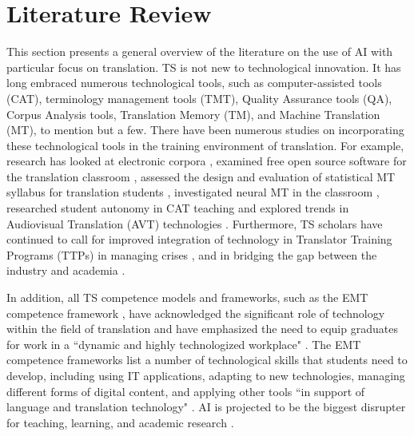 \documentclass[english]{textolivre}
\begin{document}
\section{Literature Review}
This section presents a general overview of the literature on the use of AI with particular focus on translation. TS is not new to technological innovation. It has long embraced numerous technological tools, such as computer-assisted tools (CAT), terminology management tools (TMT), Quality Assurance tools (QA), Corpus Analysis tools, Translation Memory (TM), and Machine Translation (MT), to mention but a few. There have been numerous studies on incorporating these technological tools in the training environment of translation. For example, research has looked at electronic corpora \cite{rodriguez-ines2010}, examined free open source software for the translation classroom \cite{florez2011}, assessed the design and evaluation of statistical MT syllabus for translation students \cite{doherty2014}, investigated neural MT in the classroom \cite{moorkens2018}, researched student autonomy in CAT teaching \cite{vieira2021} and explored trends in Audiovisual Translation (AVT) technologies \cite{bolanos-garcia-escribano2021}. Furthermore, TS scholars have continued to call for improved integration of technology in Translator Training Programs (TTPs) \cite{mahadin2018, tao2022} in managing crises \cite{mahadinolimat2022, mahadinolimat2023}, and in bridging the gap between the industry and academia \cite{gaspari2015, sanchez-castany2022}.

In addition, all TS competence models and frameworks, such as the EMT competence framework \cite{emt2017, europeanunion2022}, have acknowledged the significant role of technology within the field of translation and have emphasized the need to equip graduates for work in a ``dynamic and highly technologized workplace" \cite[p. 2]{europeanunion2022}. The EMT competence frameworks list a number of technological skills that students need to develop, including using IT applications, adapting to new technologies, managing different forms of digital content, and applying other tools ``in support of language and translation technology" \cite[p. 9]{europeanunion2022}. AI is projected to be the biggest disrupter for teaching, learning, and academic research \cite{dwivedi2023}. 
\end{document}
